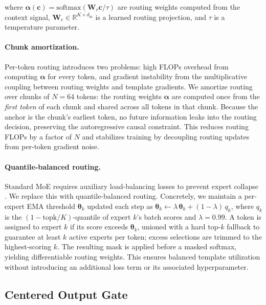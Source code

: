 \documentclass[11pt]{article}
\begin{document}
\noindent where $\boldsymbol{\alpha}(\mathbf{c}) = \text{softmax}(\mathbf{W}_r \mathbf{c} / \tau)$ are routing weights computed from the context signal, $\mathbf{W}_r \in \mathbb{R}^{K \times d_\text{in}}$ is a learned routing projection, and $\tau$ is a temperature parameter.

\paragraph{Chunk amortization.} Per-token routing introduces two problems: high FLOPs overhead from computing $\boldsymbol{\alpha}$ for every token, and gradient instability from the multiplicative coupling between routing weights and template gradients. We amortize routing over chunks of $N{=}64$ tokens: the routing weights $\boldsymbol{\alpha}$ are computed once from the \emph{first token} of each chunk and shared across all tokens in that chunk. Because the anchor is the chunk's earliest token, no future information leaks into the routing decision, preserving the autoregressive causal constraint. This reduces routing FLOPs by a factor of $N$ and stabilizes training by decoupling routing updates from per-token gradient noise.

\paragraph{Quantile-balanced routing.}
Standard MoE requires auxiliary load-balancing losses to prevent expert collapse \citep{fedus2022switch}. We replace this with quantile-balanced routing. Concretely, we maintain a per-expert EMA threshold $\boldsymbol{\theta}_k$ updated each step as $\boldsymbol{\theta}_k \leftarrow \lambda\,\boldsymbol{\theta}_k + (1{-}\lambda)\,q_k$, where $q_k$ is the $(1 - \text{topk}/K)$-quantile of expert $k$'s batch scores and $\lambda{=}0.99$. A token is assigned to expert $k$ if its score exceeds $\boldsymbol{\theta}_k$, unioned with a hard top-$k$ fallback to guarantee at least $k$ active experts per token; excess selections are trimmed to the highest-scoring $k$. The resulting mask is applied before a masked softmax, yielding differentiable routing weights. This ensures balanced template utilization without introducing an additional loss term or its associated hyperparameter.

\subsection{Centered Output Gate}
\end{document}
